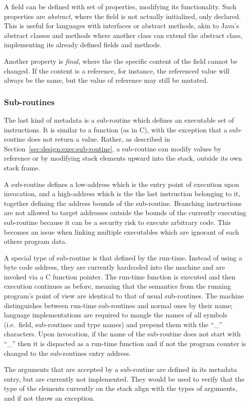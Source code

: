 A field can be defined with set of properties, modifying its functionality. Such
properties are {\em abstract}, where the field is not actually initialized, only
declared. This is useful for languages with interfaces or abstract methods, akin
to Java's abstract classes and methods where another class can extend the
abstract class, implementing its already defined fields and methods.

Another property is {\em final}, where the the specific content of the field
cannot be changed. If the content is a reference, for instance, the referenced
value will always be the same, but the value of reference may still be mutated.

\subsubsection{Sub-routines}
\label{sec:implementation:meta:sub-routines}

The last kind of metadata is a sub-routine which defines an executable set of
instructions. It is similar to a function (as in C), with the exception that a
sub-routine does not return a value. Rather, as described in
Section~\ref{sec:design:exec:sub-routine}, a sub-routine can modify values by
reference or by modifying stack elements upward into the stack, outside its own
stack frame.

A sub-routine defines a low-address which is the entry point of execution upon
invocation, and a high-address which is the the last instruction belonging to
it, together defining the address bounds of the sub-routine. Branching
instructions are not allowed to target addresses outside the bounds of the
currently executing sub-routine because it can be a security risk to execute
arbitrary code. This becomes an issue when linking multiple executables which
are ignorant of each others program data.

A special type of sub-routine is that defined by the run-time. Instead of using
a byte code address, they are currently hardcoded into the machine and are
invoked via a C function pointer. The run-time function is executed and then
execution continues as before, meaning that the semantics from the running
program's point of view are identical to that of usual sub-routines. The machine
distinguishes between run-time sub-routines and normal ones by their name;
language implementations are required to mangle the names of all symbols
(i.e.~field, sub-routines and type names) and prepend them with the ``\_''
characters. Upon invocation, if the name of the sub-routine does not start with
``\_'' then it is dispacted as a run-time function and if not the program
counter is changed to the sub-routines entry address.

The arguments that are accepted by a sub-routine are defined in its metadata
entry, but are currently not implemented. They would be used to verify that the
type of the elements currently on the stack align with the types of arguments,
and if not throw an exception.

